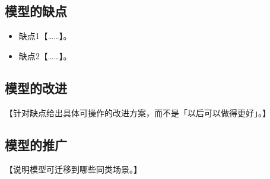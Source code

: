 \documentclass[withoutpreface,bwprint]{cumcmthesis}
\begin{document}
\subsection{模型的缺点}
\begin{itemize}[itemindent=2em]
    \item 缺点1【……】。
    \item 缺点2【……】。
\end{itemize}

\subsection{模型的改进}

【针对缺点给出具体可操作的改进方案，而不是「以后可以做得更好」。】

\subsection{模型的推广}

【说明模型可迁移到哪些同类场景。】

%
\newpage
%
\CumcmAINotUsed
%
%



\end{document}
